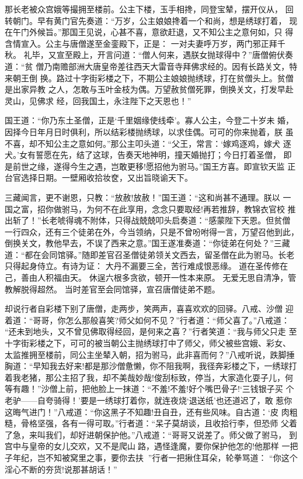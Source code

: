 那长老被众宫娥等撮拥至楼前。公主下楼，玉手相搀，同登宝辇，摆开仪从，
回转朝门。早有黄门官先奏道：“万岁，公主娘娘搀着一个和尚，想是绣球打着，
现在午门外候旨。”那国王见说，心甚不喜，意欲赶退，又不知公主之意何如，只
得含情宣入。公主与唐僧遂至金銮殿下，正是：
一对夫妻呼万岁，两门邪正拜千秋。
礼毕，又宣至殿上，开言问道：“僧人何来，遇朕女抛球得中？”唐僧俯伏奏道：“贫
僧乃南赡部洲大唐皇帝差往西天大雷音寺拜佛求经的。因有长路关文，特来朝王倒
换。路过十字街彩楼之下，不期公主娘娘抛绣球，打在贫僧头上。贫僧是出家异教
之人，怎敢与玉叶金枝为偶。万望赦贫僧死罪，倒换关文，打发早赴灵山，见佛求
经，回我国土，永注陛下之天恩也！”

国王道：“你乃东土圣僧，正是‘千里姻缘使线牵’。寡人公主，今登二十岁未
婚，因择今日年月日时俱利，所以结彩楼抛绣球，以求佳偶。可可的你来抛着，朕
虽不喜，却不知公主之意如何。”那公主叩头道：“父王，常言：‘嫁鸡逐鸡，嫁犬
逐犬。’女有誓愿在先，结了这球，告奏天地神明，撞天婚抛打；今日打着圣僧，
即是前世之缘，遂得今生之遇，岂敢更移!愿招他为驸马。”国王方喜。即宣钦天监
正台官选择日期。一壁厢收拾妆奁，又出旨晓谕天下。

三藏闻言，更不谢恩，只教：“放赦!放赦！”国王道：“这和尚甚不通理。朕以
一国之富，招你做驸马，为何不在此享用，念念只要取经!再若推辞，教锦衣官校
推出斩了！”长老唬得魂不附体，只得战兢兢叩头启奏道：“感蒙陛下天恩。但贫僧
一行四众，还有三个徒弟在外，今当领纳，只是不曾吩咐得一言，万望召他到此，
倒换关文，教他早去，不误了西来之意。”国王遂准奏道：“你徒弟在何处？”三藏
道：“都在会同馆驿。”随即差官召圣僧徒弟领关文西去，留圣僧在此为驸马。长老
只得起身侍立。有诗为证：
大丹不漏要三全，苦行难成恨恶缘。
道在圣传修在己，善由人积福由天。
休逞六根多贪欲，顿开一性本来原。
无爱无思自清净，管教解脱得超然。
当时差官至会同馆驿，宣召唐僧徒弟不题。

却说行者自彩楼下别了唐僧，走两步，笑两声，喜喜欢欢的回驿。八戒、沙僧
迎着道：“哥哥，你怎么那般喜笑?师父如何不见？”行者道：“师父喜了。”八戒道：
“还未到地头，又不曾见佛取得经回，是何来之喜？”行者笑道：“我与师父只走
至十字街彩楼之下，可可的被当朝公主抛绣球打中了师父，师父被些宫娥、彩女、
太监推拥至楼前，同公主坐辇入朝，招为驸马，此非喜而何？”八戒听说，跌脚捶
胸道：“早知我去好来!都是那沙僧惫懒，你不阻我啊，我径奔彩楼之下，一绣球打
着我老猪，那公主招了我，却不美哉妙哉!俊刮标致，停当，大家造化耍子儿，何
等有趣！”沙僧上前，把他脸上一抹道：“不羞!不羞!好个嘴巴骨子!‘三钱银子买
个老驴——自夸骑得！’要是一绣球打着你，就连夜烧‘退送纸’也还道迟了，敢
惹你这晦气进门！”八戒道：“你这黑子不知趣!丑自丑，还有些风味。自古道：‘皮
肉粗糙，骨格坚强，各有一得可取。”行者道：“呆子莫胡谈，且收拾行李，但恐师
父着了急，来叫我们，却好进朝保护他。”八戒道：“哥哥又说差了。师父做了驸马，
到宫中与皇帝的女儿交欢，又不是爬山路，遇怪逢魔，要你保护他怎的!他那样
一把子年纪，岂不知被窝里之事，要你去扶？”行者一把揪住耳朵，轮拳骂道：
“你这个淫心不断的夯货!说那甚胡话！”

